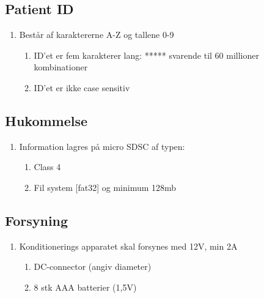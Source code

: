 \documentclass[11pt]{article}
\begin{document}
	\subsection{Patient ID}
	\begin{enumerate}
		\setlength\itemsep{0cm} %
		\item Består af karaktererne A-Z og tallene 0-9
		\begin{enumerate}
			\item ID’et er fem karakterer lang: ***** svarende til 60 millioner kombinationer
			\item ID’et er ikke case sensitiv
		\end{enumerate}
	\end{enumerate}
	
	
	\subsection{Hukommelse}
	\begin{enumerate}
		\setlength\itemsep{0cm} %
		\item Information lagres på micro SDSC af typen:
		\begin{enumerate}
			\item Class 4
			\item Fil system [fat32] og minimum 128mb
		\end{enumerate}
	\end{enumerate}
	
	\subsection{Forsyning}
	\begin{enumerate}
		\setlength\itemsep{0cm} %
		\item Konditionerings apparatet skal forsynes med 12V, min 2A
		\begin{enumerate}
			\item DC-connector (angiv diameter) 
			\item 8 stk AAA batterier (1,5V)
		\end{enumerate}
	\end{enumerate}
	
	
\end{document}
